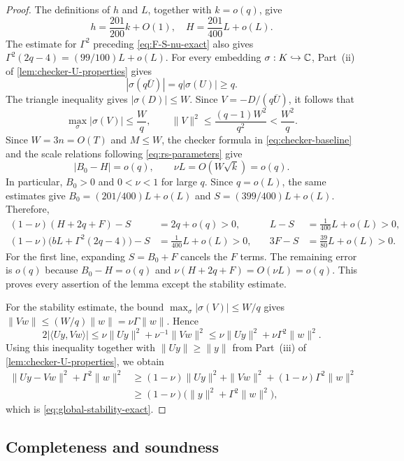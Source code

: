 \begin{proof}
The definitions of $h$ and $L$, together with $k=o(q)$, give
\[
 h=\frac{201}{200}k+O(1),
 \quad
 H=\frac{201}{400}L+o(L).
\]
The estimate for $\Gamma^2$ preceding
\cref{eq:F-S-nu-exact} also gives
$\Gamma^2(2q-4)=(99/100)L+o(L)$.
For every embedding $\sigma:K\hookrightarrow\mathbb C$, Part~(ii) of
\cref{lem:checker-U-properties} gives
\[
 |\sigma(q\overline U)|=q|\sigma(U)|\ge q.
\]
The triangle inequality gives $|\sigma(D)|\le W$.  Since
$V=-D/(q\overline U)$, it follows that
\[
 \max_\sigma|\sigma(V)|\le\frac Wq,
 \qquad
 \|V\|^2\le\frac{(q-1)W^2}{q^2}<\frac{W^2}{q}.
\]
Since
$W=3n=O(T)$ and $M\le W$, the checker formula
in \cref{eq:checker-baseline} and the scale relations following
\cref{eq:rs-parameters} give
\[
 |B_0-H|=o(q),
 \qquad
 \nu L=O(W\sqrt{k})=o(q).
\]
In particular, $B_0>0$ and $0<\nu<1$ for large $q$.
Since $q=o(L)$, the same estimates give
$B_0=(201/400)L+o(L)$ and $S=(399/400)L+o(L)$.  Therefore,
\[
\begin{aligned}
 (1-\nu)(H+2q+F)-S&=2q+o(q)>0,
 &\quad L-S&=\frac1{400}L+o(L)>0,\\
 (1-\nu)\bigl(bL+\Gamma^2(2q-4)\bigr)-S
   &=\frac1{400}L+o(L)>0,
 &\quad 3F-S&=\frac{39}{80}L+o(L)>0.
\end{aligned}
\]
For the first line, expanding $S=B_0+F$ cancels the $F$ terms.
The remaining error is $o(q)$ because $B_0-H=o(q)$ and
$\nu(H+2q+F)=O(\nu L)=o(q)$.
This proves every assertion of the lemma except the stability
estimate.

For the stability estimate, the bound
$\max_\sigma|\sigma(V)|\le W/q$ gives
$\|Vw\|\le(W/q)\|w\|=\nu\Gamma\|w\|$.  Hence
\[
 2|\langle Uy,Vw\rangle|
 \le \nu\|Uy\|^2+\nu^{-1}\|Vw\|^2
 \le \nu\|Uy\|^2+\nu\Gamma^2\|w\|^2.
\]
Using this inequality together with
$\|Uy\|\ge\|y\|$ from Part~(iii) of
\cref{lem:checker-U-properties}, we obtain
\begin{align*}
 \|Uy-Vw\|^2+\Gamma^2\|w\|^2
 &\ge (1-\nu)\|Uy\|^2+\|Vw\|^2
   +(1-\nu)\Gamma^2\|w\|^2\\
 &\ge (1-\nu)
   \bigl(\|y\|^2+\Gamma^2\|w\|^2\bigr),
\end{align*}
which is \cref{eq:global-stability-exact}.

\end{proof}

\subsection{Completeness and soundness}

